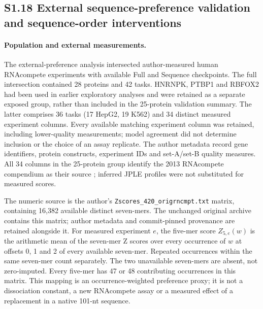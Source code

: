 \documentclass[11pt]{article}
\begin{document}
\subsection*{S1.18 External sequence-preference validation and sequence-order interventions}

\paragraph{Population and external measurements.}
The external-preference analysis intersected author-measured human RNAcompete experiments with available Full and Sequence checkpoints. The full intersection contained 28 proteins and 42 tasks. HNRNPK, PTBP1 and RBFOX2 had been used in earlier exploratory analyses and were retained as a separate exposed group, rather than included in the 25-protein validation summary. The latter comprises 36 tasks (17 HepG2, 19 K562) and 34 distinct measured experiment columns. Every available matching experiment column was retained, including lower-quality measurements; model agreement did not determine inclusion or the choice of an assay replicate. The author metadata record gene identifiers, protein constructs, experiment IDs and set-A/set-B quality measures. All 34 columns in the 25-protein group identify the 2013 RNAcompete compendium as their source \citep{ray2013compendium}; inferred JPLE profiles were not substituted for measured scores.

The numeric source is the author's \texttt{Zscores\_420\_origrncmpt.txt} matrix, containing 16,382 available distinct seven-mers. The unchanged original archive  contains this matrix; author metadata and commit-pinned provenance are retained alongside it. For measured experiment \(e\), the five-mer score \(Z_{5,e}(w)\) is the arithmetic mean of the seven-mer Z scores over every occurrence of \(w\) at offsets 0, 1 and 2 of every available seven-mer. Repeated occurrences within the same seven-mer count separately. The two unavailable seven-mers are absent, not zero-imputed. Every five-mer has 47 or 48 contributing occurrences in this matrix. This mapping is an occurrence-weighted preference proxy; it is not a dissociation constant, a new RNAcompete assay or a measured effect of a replacement in a native 101-nt sequence.
\end{document}
